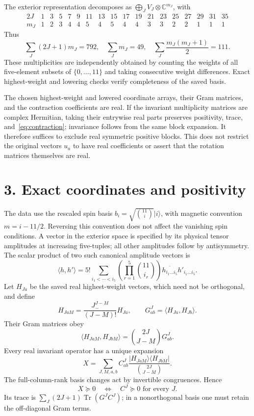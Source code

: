 \documentclass[11pt]{article}
\newcommand{\Tr}{\operatorname{Tr}}
\begin{document}
The exterior representation decomposes as $\bigoplus_J V_J\otimes\mathbb C^{m_J}$, with
\begingroup\setlength{\arraycolsep}{3pt}\small
\[
\begin{array}{c|rrrrrrrrrrrrrrrrr}
2J&1&3&5&7&9&11&13&15&17&19&21&23&25&27&29&31&35\\\hline
m_J&1&2&3&4&4&5&4&5&4&4&3&3&2&2&1&1&1
\end{array}
\]
\endgroup
Thus
\[
\sum_J(2J+1)m_J=792,\quad
\sum_Jm_J=49,\quad
\sum_J\frac{m_J(m_J+1)}2=111.
\]
These multiplicities are independently obtained by counting the weights of all five-element subsets of $\{0,\ldots,11\}$ and taking consecutive weight differences. Exact highest-weight and lowering checks verify completeness of the saved basis.

The chosen highest-weight and lowered coordinate arrays, their Gram matrices, and the contraction coefficients are real. If the invariant multiplicity matrices are complex Hermitian, taking their entrywise real parts preserves positivity, trace, and~\eqref{eq:contraction}; invariance follows from the same block expansion. It therefore suffices to exclude real symmetric positive blocks. This does not restrict the original vectors $u_a$ to have real coefficients or assert that the rotation matrices themselves are real.

\section*{3. Exact coordinates and positivity}
The data use the rescaled spin basis $b_i=\sqrt{\binom{11}{i}}|i\rangle$, with magnetic convention $m=i-11/2$. Reversing this convention does not affect the vanishing spin conditions. A vector in the exterior space is specified by its physical tensor amplitudes at increasing five-tuples; all other amplitudes follow by antisymmetry. The scalar product of two such canonical amplitude vectors is
\[
\langle h,h'\rangle=5!\sum_{i_1<\cdots<i_5}
\left(\prod_{r=1}^5\binom{11}{i_r}\right)
\overline{h_{i_1\ldots i_5}}h'_{i_1\ldots i_5}.
\]
Let $H_{Ja}$ be the saved real highest-weight vectors, which need not be orthogonal, and define
\[
H_{JaM}=\frac{J_-^{J-M}}{(J-M)!}H_{Ja},\qquad
G^J_{ab}=\langle H_{Ja},H_{Jb}\rangle.
\]
Their Gram matrices obey
\[
\langle H_{JaM},H_{JbM}\rangle
=\binom{2J}{J-M}G^J_{ab}.
\]
Every real invariant operator has a unique expansion
\[
X=\sum_{J,M,a,b}C^J_{ab}
\frac{|H_{JaM}\rangle\langle H_{JbM}|}{\binom{2J}{J-M}}.
\]
The full-column-rank basis changes act by invertible congruences. Hence
\[
X\succeq0\quad\Longleftrightarrow\quad C^J\succeq0\text{ for every }J.
\]
Its trace is $\sum_J(2J+1)\Tr(G^JC^J)$; in a nonorthogonal basis one must retain the off-diagonal Gram terms.
\end{document}
